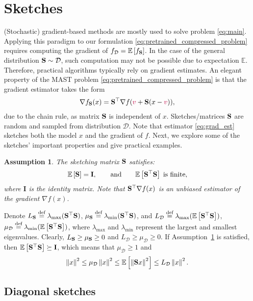 \documentclass{article}
\newcommand{\shift}{{\color{purple}s}}
\newcommand{\bb}{\mathbb}
\newcommand{\norm}[1]{\left\| #1 \right\|}
\newcommand{\cD}{\mathcal{D}}
\newcommand{\mI}{\mathbf{I}}
\newcommand{\eqdef}{\stackrel{\text{def}}{=}}
\newcommand{\Exp}[1]{{\bb E}\left[#1\right]}
\newtheorem{assumption}{Assumption}
\theoremstyle{plain}
\newcommand{\tf}{f_{\mathcal{D}}}
\renewcommand{\shift}{{\color{purple}v}}
\newcommand{\mS}{{\bf S}}
\theoremstyle{plain}
\theoremstyle{definition}
\theoremstyle{remark}
\begin{document}
\section{Sketches}
\label{sec:sketches}
(Stochastic) gradient-based methods are mostly used to solve problem \eqref{eq:main}. Applying this paradigm to our formulation \eqref{eq:pretrained_compressed_problem} requires computing the gradient of $\tf = \Exp{f_{\mS}}$. In the case of the general distribution $\mS \sim \cD$, such computation may not be possible due to expectation $\mathbb{E}$. Therefore, practical algorithms typically rely on gradient estimates. An elegant property of the MAST problem \eqref{eq:pretrained_compressed_problem} is that the gradient estimator takes the form
\begin{equation} \label{eq:grad_est}
	\nabla f_{\mS}(x) = \mS^\top \nabla f(\shift + \mS(x - \shift)),
\end{equation}
due to the chain rule, as matrix $\mS$ is independent of $x$. Sketches/matrices $\mS$ are random and sampled from distribution $\cD$.
Note that estimator \eqref{eq:grad_est} sketches both the model $x$ and the gradient of $f$.
Next, we explore some of the sketches' important properties and give practical examples.
\begin{assumption} \label{ass:C}
	The sketching matrix $\mS$ satisfies:
	\begin{equation} \label{eq:sketch_def}
		\Exp{\mS } = \mI, \qquad \text{and} \qquad \Exp{\mS^\top \mS} \; \text{is finite},
	\end{equation}
	where $\mI$ is the identity matrix. Note that $\mS^\top \nabla f(x)$ is an unbiased estimator of the gradient $\nabla f(x)$.
\end{assumption}
Denote $L_{\mS}\eqdef \lambda_{\max}(\mS^\top \mS)$, $\mu_{\mS}\eqdef \lambda_{\min}(\mS^\top \mS)$, and $L_{\mathcal{D}} \eqdef \lambda_{\max}(\Exp{\mS^\top \mS})$, $ \mu_{\mathcal{D}} \eqdef \lambda_{\min}(\Exp{\mS^\top \mS})$,  where $\lambda_{\max}$ and $\lambda_{\min}$ represent the largest and smallest eigenvalues.
%
Clearly, $L_{\mS}\geq \mu_{\mS}\geq 0$ and $L_{\mathcal{D}} \geq \mu_{\mathcal{D}} \geq 0$.
If Assumption~\ref{ass:C} is satisfied, then $\Exp{\mS^\top \mS} \succeq \mI$, which means that $\mu_{\mathcal{D}} \geq 1$ and
\[ \norm{x}^2 \leq \mu_{\mathcal{D}} \norm{x}^2  \leq \Exp{\norm{\mS x}^2} \leq L_{\mathcal{D}} \norm{x}^2.\]


\subsection{Diagonal sketches}
\end{document}
